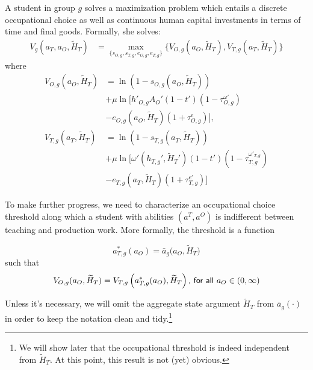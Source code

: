 \documentclass[onehalfspacing,11pt]{article}
\begin{document}
	A student in group $g$ solves a maximization problem which entails a discrete occupational choice as well as continuous human capital investments in terms of time and final goods. Formally, she solves:
	\begin{align}
		\label{}
		V_g(a_T,a_O,\widetilde{H}_T) & = \max_{\{s_{O,g},s_{T,g},e_{O,g},e_{T,g}\}} \bigg\{ V_{O,g}(a_O,\widetilde{H}_T), V_{T,g}(a_T,\widetilde{H}_T) \bigg\} \label{eq:V}
	\end{align}
	where
	\begin{align}
		V_{O,g}(a_O,\widetilde{H}_T) & = \ln\left(1-s_{O,g}\left(a_O,\widetilde{H}_T\right)\right) \nonumber \\
		& + \mu \ln \Big[ {{h'}_{O,g}} A_O'(1-t')(1-\tau^{\omega '}_{O,g}) \nonumber \\
		& - e_{O,g}(a_O,\widetilde{H}_T)(1+\tau^e_{O,g}) \Big], \label{eq:VO} \\
		V_{T,g}(a_T,\widetilde{H}_T) & = \ln\left(1-s_{T,g}\left(a_T,\widetilde{H}_T\right)\right) \nonumber \\
		& + \mu \ln \Big[ \omega'({h_{T,g}'},{\widetilde{H}_{T}'})(1-t')(1-\tau^{\omega'_{T,g}}_{T,g}) \nonumber \\
		& - e_{T,g}(a_T,\widetilde{H}_T)(1+\tau^{e '}_{T,g}) \Big] \label{eq:VT}
	\end{align}
	
	To make further progress, we need to characterize an occupational choice threshold along which a student with abilities $(a^T,a^O)$ is indifferent between teaching and production work. More formally, the threshold is a function
	
	\begin{equation*}
		a^*_{T,g}(a_O) = \bar{a}_g\big(a_{O},\widetilde{H}_T\big) %
	\end{equation*}
	such that
	\begin{equation}
		\label{eq:indiff}
		V_{O,g}(a_{O},\widetilde{H}_T) = V_{T,g}\left(a^*_{T,g}(a_O),\widetilde{H}_T\right) \textrm{{\sf , for all} } a_O \in (0,\infty)
	\end{equation}
	
	Unless it's necessary, we will omit the aggregate state argument $\widetilde{H}_T$ from $\bar{a}_g(\cdot)$ in order to keep the notation clean and tidy.\footnote{We will show later that the occupational threshold is indeed independent from $\widetilde{H}_T$. At this point, this result is not (yet) obvious.}
	
\end{document}
